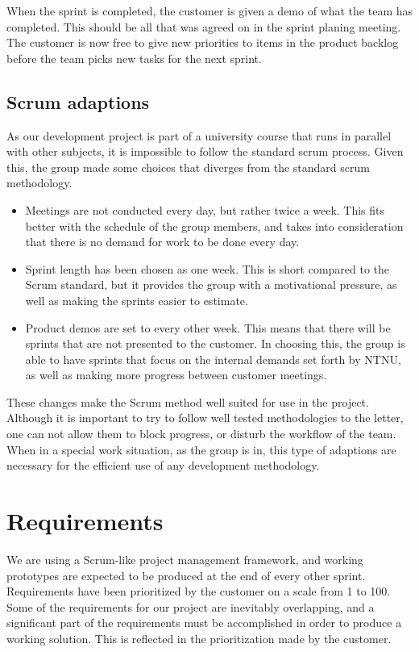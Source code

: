 \documentclass[11pt,a4paper,titlepage,oneside]{report}
\begin{document}
When the sprint is completed, the customer is given a demo of what the team has completed. This should be all that was agreed on in the sprint planing meeting. The customer is now free to give new priorities to items in the product backlog before the team picks new tasks for the next sprint. 

\subsection{Scrum adaptions}
\label{subsec:scrumadaptations}
As our development project is part of a university course that runs in parallel with other subjects, it is impossible to follow the standard scrum process. Given this, the group made some choices that diverges from the standard scrum methodology.

\begin{itemize}
\item Meetings are not conducted every day, but rather twice a week. This fits better with the schedule of the group members, and takes into consideration that there is no demand for work to be done every day. 
\item Sprint length has been chosen as one week. This is short compared to the Scrum standard, but it provides the group with a motivational pressure, as well as making the sprints easier to estimate. 
\item Product demos are set to every other week. This means that there will be sprints that are not presented to the customer. In choosing this, the group is able to have sprints that focus on the internal demands set forth by NTNU, as well as making more progress between customer meetings.
\end {itemize}

These changes make the Scrum method well suited for use in the project. Although it is important to try to follow well tested methodologies to the letter, one can not allow them to block progress, or disturb the workflow of the team. When in a special work situation, as the group is in, this type of adaptions are necessary for the efficient use of any development methodology. 

\section{Requirements}
We are using a Scrum-like project management framework, and working prototypes are expected to be produced at the end of every other sprint. Requirements have been prioritized by the customer on a scale from 1 to 100. Some of the requirements for our project are inevitably overlapping, and a significant part of the requirements must be accomplished in order to produce a working solution. This is reflected in the prioritization made by the customer.
\end{document}
